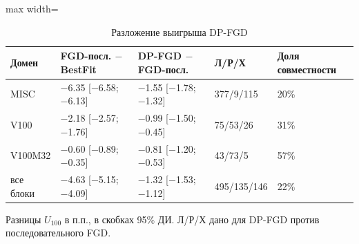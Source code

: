 \begin{table}[htbp]
\centering
\small
\caption{Разложение выигрыша DP-FGD}
\label{tab:mixedsplit}
\begin{adjustbox}{max width=\textwidth}
\begin{tabular}{lllll}
\toprule
Домен & FGD-посл. \(-\) BestFit & DP-FGD \(-\) FGD-посл. & Л/Р/Х & Доля совместности \\
\midrule
MISC & \(-\)6.35 [\(-\)6.58; \(-\)6.13] & \(-\)1.55 [\(-\)1.78; \(-\)1.32] & 377/9/115 & 20\% \\
V100 & \(-\)2.18 [\(-\)2.57; \(-\)1.76] & \(-\)0.99 [\(-\)1.50; \(-\)0.45] & 75/53/26 & 31\% \\
V100M32 & \(-\)0.60 [\(-\)0.89; \(-\)0.35] & \(-\)0.81 [\(-\)1.20; \(-\)0.53] & 43/73/5 & 57\% \\
\midrule
все блоки & \(-\)4.63 [\(-\)5.15; \(-\)4.09] & \(-\)1.32 [\(-\)1.53; \(-\)1.12] & 495/135/146 & 22\% \\
\bottomrule
\end{tabular}
\end{adjustbox}
\par\smallskip
\parbox{0.95\textwidth}{\footnotesize Разницы \(U_{100}\) в п.п., в скобках 95\% ДИ. Л/Р/Х дано для DP-FGD против последовательного FGD.}
\end{table}
